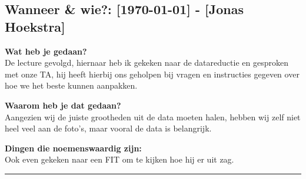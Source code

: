 
\subsection*{Wanneer \& wie?: [\today] - [Jonas Hoekstra]}

\textbf{Wat heb je gedaan?}\\
De lecture gevolgd, hiernaar heb ik gekeken naar de datareductie en gesproken met onze TA, hij heeft hierbij ons geholpen bij vragen en instructies gegeven over hoe we het beste kunnen aanpakken.
\vspace{0.3cm} 

\noindent \textbf{Waarom heb je dat gedaan?}\\
Aangezien wij de juiste grootheden uit de data moeten halen, hebben wij zelf niet heel veel aan de foto’s, maar vooral de data is belangrijk.

\noindent \textbf{Dingen die noemenswaardig zijn:}\\
Ook even gekeken naar een FIT om te kijken hoe hij er uit zag.


\vspace{0.5cm}
\hrule 
\vspace{0.5cm}


